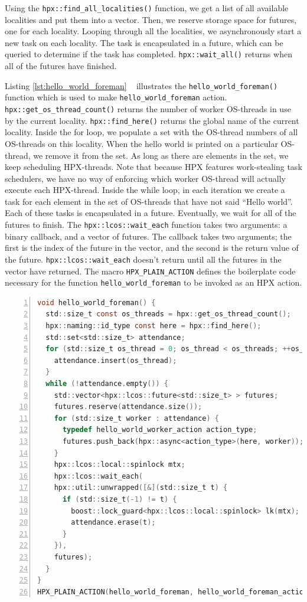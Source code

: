 Using the \verb|hpx::find_all_localities()| function, we get a list of all available localities and put them into a vector. Then, we reserve storage space for futures, one for each locality. Looping through all the localities, we asynchronously start a new task on each locality. The task is encapsulated in a future, which can be queried to determine if the task has completed. \verb|hpx::wait_all()| returns when all of the futures have finished.

Listing \ref{lst:hello_world_foreman} ~\cite{hpx_hello} illustrates the \verb|hello_world_foreman()| function which is used to make \verb|hello_world_foreman| action. \verb|hpx::get_os_thread_count()| returns the number of worker OS-threads in use by the current locality. \verb|hpx::find_here()| returns the global name of the current locality. Inside the for loop, we populate a set with the OS-thread numbers of all OS-threads on this locality. When the hello world is printed on a particular OS-thread, we remove it from the set. As long as there are elements in the set, we keep scheduling HPX-threads. Note that because HPX features work-stealing task schedulers, we have no way of enforcing which worker OS-thread will actually execute each HPX-thread. Inside the while loop, in each iteration we create a task for each element in the set of OS-threads that have not said ``Hello world''. Each of these tasks is encapsulated in a future. Eventually, we wait for all of the futures to finish. The \verb|hpx::lcos::wait_each| function takes two arguments: a binary callback, and a vector of futures. The callback takes two arguments; the first is the index of the future in the vector, and the second is the return value of the future. \verb|hpx::lcos::wait_each| doesn't return until all the futures in the vector have returned. The macro \verb|HPX_PLAIN_ACTION| defines the boilerplate code necessary for the function \verb|hello_world_foreman| to be invoked as an HPX action.

\begin{lstlisting}[language=C, frame=single, numbers=left, basicstyle=\footnotesize, caption=Hello World Foreman\label{lst:hello_world_foreman}]
void hello_world_foreman() {
  std::size_t const os_threads = hpx::get_os_thread_count();
  hpx::naming::id_type const here = hpx::find_here();
  std::set<std::size_t> attendance;
  for (std::size_t os_thread = 0; os_thread < os_threads; ++os_thread) {
    attendance.insert(os_thread);
  }
  while (!attendance.empty()) {
    std::vector<hpx::lcos::future<std::size_t> > futures;
    futures.reserve(attendance.size());
    for (std::size_t worker : attendance) {
      typedef hello_world_worker_action action_type;
      futures.push_back(hpx::async<action_type>(here, worker));
    }
    hpx::lcos::local::spinlock mtx;
    hpx::lcos::wait_each(
    hpx::util::unwrapped([&](std::size_t t) {
      if (std::size_t(-1) != t) {
        boost::lock_guard<hpx::lcos::local::spinlock> lk(mtx);
        attendance.erase(t);
      }
    }),
    futures);
  }
}
HPX_PLAIN_ACTION(hello_world_foreman, hello_world_foreman_action);
\end{lstlisting}

